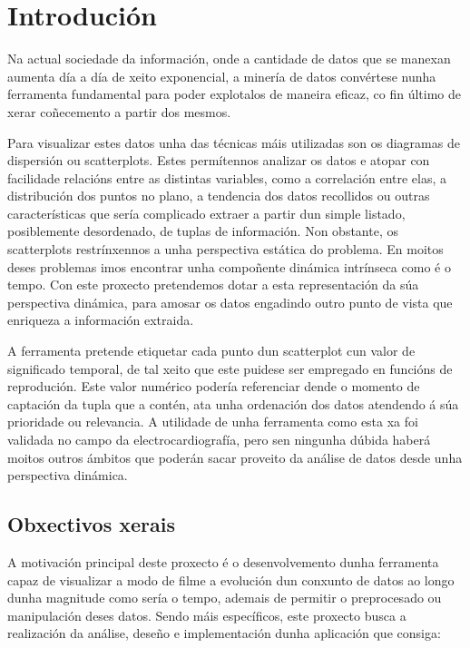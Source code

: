 \chapter{Introdución}

Na actual sociedade da información, onde a cantidade de datos que se manexan aumenta día a día de xeito exponencial, a minería de datos convértese nunha ferramenta fundamental para poder explotalos de maneira eficaz, co fin último de xerar coñecemento a partir dos mesmos.

Para visualizar estes datos unha das técnicas máis utilizadas son os diagramas de dispersión ou scatterplots. Estes permítennos analizar os datos e atopar con facilidade relacións entre as distintas variables, como a correlación entre elas, a distribución dos puntos no plano, a tendencia dos datos recollidos ou outras características que sería complicado extraer a partir dun simple listado, posiblemente desordenado, de tuplas de información. Non obstante, os scatterplots restrínxennos a unha perspectiva estática do problema. En moitos deses problemas imos encontrar unha compoñente dinámica intrínseca como é o tempo. Con este proxecto pretendemos dotar a esta representación da súa perspectiva dinámica, para amosar os datos engadindo outro punto de vista que enriqueza a información extraida.

A ferramenta pretende etiquetar cada punto dun scatterplot cun valor de significado temporal, de tal xeito que este puidese ser empregado en funcións de reprodución. Este valor numérico podería referenciar dende o momento de captación da tupla que a contén, ata unha ordenación dos datos atendendo á súa prioridade ou relevancia. A utilidade de unha ferramenta como esta xa foi validada no campo da electrocardiografía, pero sen ningunha dúbida haberá moitos outros ámbitos que poderán sacar proveito da análise de datos desde unha perspectiva dinámica.

\section{Obxectivos xerais}

A motivación principal deste proxecto é o desenvolvemento dunha ferramenta capaz de visualizar a modo de filme a evolución dun conxunto de datos ao longo dunha magnitude como sería o tempo, ademais de permitir o preprocesado ou manipulación deses datos. Sendo máis específicos, este proxecto busca a realización da análise, deseño e implementación dunha aplicación que consiga: 

